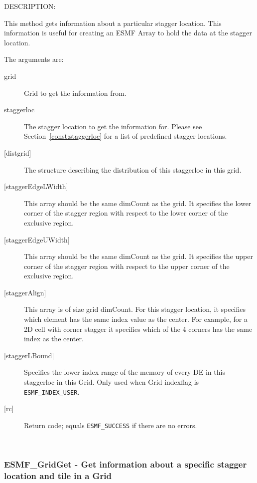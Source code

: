 {\sf DESCRIPTION:\\ }


    This method gets information about a particular stagger location.
    This information is useful for creating an ESMF Array to hold
    the data at the stagger location.
  
  The arguments are:
  \begin{description}
  \item[grid]
      Grid to get the information from.
  \item[staggerloc]
       The stagger location to get the information for.
       Please see Section~\ref{const:staggerloc} for a list
       of predefined stagger locations.
  \item[{[distgrid]}]
     The structure describing the distribution of this staggerloc in this grid.
   \item[{[staggerEdgeLWidth]}]
        This array should be the same dimCount as the grid. It specifies the lower corner of the stagger
        region with respect to the lower corner of the exclusive region.
   \item[{[staggerEdgeUWidth]}]
        This array should be the same dimCount as the grid. It specifies the upper corner of the stagger
        region with respect to the upper corner of the exclusive region.
   \item[{[staggerAlign]}]
        This array is of size  grid dimCount.
        For this stagger location, it specifies which element
        has the same index value as the center. For example,
        for a 2D cell with corner stagger it specifies which
        of the 4 corners has the same index as the center.
   \item[{[staggerLBound]}]
        Specifies the lower index range of the memory of every DE in this staggerloc in this Grid.
        Only used when Grid indexflag is {\tt ESMF\_INDEX\_USER}.
  \item[{[rc]}]
       Return code; equals {\tt ESMF\_SUCCESS} if there are no errors.
  \end{description}
   
 
\mbox{}\hrulefill\ 
 

  \label{API:GridGetPSlocPTile}\subsubsection [ESMF\_GridGet] {ESMF\_GridGet - Get information about a specific stagger location and tile in a Grid}


